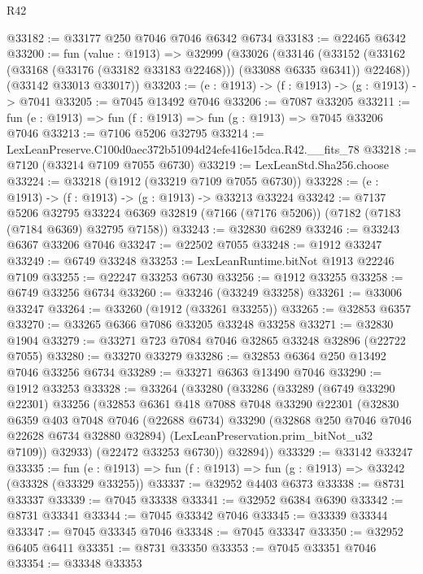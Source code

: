 \begin{lexlean}{R42}
\begin{coremodule}
{@33182 := @33177 @250 @7046 @7046 @6342 @6734
@33183 := @22465 @6342
@33200 := fun (value : @1913) =>
  @32999
    (@33026
      (@33146
        (@33152 (@33162 (@33168 (@33176 (@33182 @33183 @22468))) (@33088 @6335 @6341)) @22468))
      (@33142 @33013 @33017))
@33203 := (e : @1913) -> (f : @1913) -> (g : @1913) -> @7041
@33205 := @7045 @13492 @7046
@33206 := @7087 @33205
@33211 := fun (e : @1913) => fun (f : @1913) => fun (g : @1913) => @7045 @33206 @7046
@33213 := @7106 @5206 @32795
@33214 := LexLeanPreserve.C100d0aec372b51094d24efe416e15dca.R42.__fits_78
@33218 := @7120 (@33214 @7109 @7055 @6730)
@33219 := LexLeanStd.Sha256.choose
@33224 := @33218 (@1912 (@33219 @7109 @7055 @6730))
@33228 := (e : @1913) -> (f : @1913) -> (g : @1913) -> @33213 @33224
@33242 := @7137
    @5206
    @32795
    @33224
    @6369
    @32819
    (@7166 (@7176 @5206))
    (@7182 (@7183 (@7184 @6369) @32795 @7158))
@33243 := @32830 @6289
@33246 := @33243 @6367 @33206 @7046
@33247 := @22502 @7055
@33248 := @1912 @33247
@33249 := @6749 @33248
@33253 := LexLeanRuntime.bitNot @1913 @22246 @7109
@33255 := @22247 @33253 @6730
@33256 := @1912 @33255
@33258 := @6749 @33256 @6734
@33260 := @33246 (@33249 @33258)
@33261 := @33006 @33247
@33264 := @33260 (@1912 (@33261 @33255))
@33265 := @32853 @6357
@33270 := @33265 @6366 @7086 @33205 @33248 @33258
@33271 := @32830 @1904
@33279 := @33271 @723 @7084 @7046 @32865 @33248 @32896 (@22722 @7055)
@33280 := @33270 @33279
@33286 := @32853 @6364 @250 @13492 @7046 @33256 @6734
@33289 := @33271 @6363 @13490 @7046
@33290 := @1912 @33253
@33328 := @33264
    (@33280
      (@33286
        (@33289
          (@6749 @33290 @22301)
          @33256
          (@32853
            @6361
            @418
            @7088
            @7048
            @33290
            @22301
            (@32830
              @6359
              @403
              @7048
              @7046
              (@22688 @6734)
              @33290
              (@32868 @250 @7046 @7046 @22628 @6734 @32880 @32894)
              (LexLeanPreservation.prim_bitNot_u32 @7109))
            @32933)
          (@22472 @33253 @6730))
        @32894))
@33329 := @33142 @33247
@33335 := fun (e : @1913) => fun (f : @1913) => fun (g : @1913) => @33242 (@33328 (@33329 @33255))
@33337 := @32952 @4403 @6373
@33338 := @8731 @33337
@33339 := @7045 @33338
@33341 := @32952 @6384 @6390
@33342 := @8731 @33341
@33344 := @7045 @33342 @7046
@33345 := @33339 @33344
@33347 := @7045 @33345 @7046
@33348 := @7045 @33347
@33350 := @32952 @6405 @6411
@33351 := @8731 @33350
@33353 := @7045 @33351 @7046
@33354 := @33348 @33353
}
\end{coremodule}
\end{lexlean}
